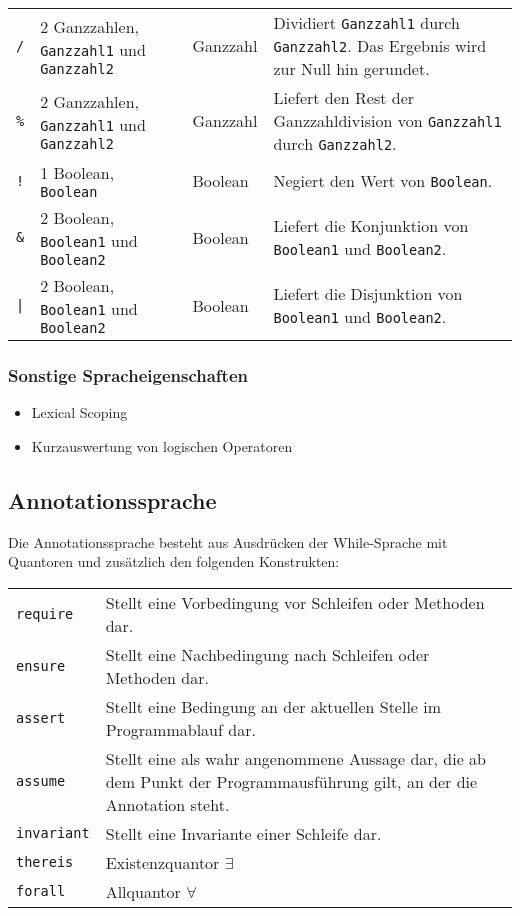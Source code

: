 \documentclass[a4paper,10pt]{article}
\begin{document}
\begin{tabularx}{\textwidth}{| l | X | l | X |}
\texttt{/} & 2 Ganzzahlen, \texttt{Ganzzahl1} und \texttt{Ganzzahl2} & Ganzzahl & Dividiert \texttt{Ganzzahl1} durch \texttt{Ganzzahl2}. Das Ergebnis wird zur Null hin gerundet.\\
\texttt{\%} & 2 Ganzzahlen, \texttt{Ganzzahl1} und \texttt{Ganzzahl2} & Ganzzahl & Liefert den Rest der Ganzzahldivision von \texttt{Ganzzahl1} durch \texttt{Ganzzahl2}.\\
\hline
\texttt{!} & 1 Boolean, \texttt{Boolean} & Boolean & Negiert den Wert von \texttt{Boolean}.\\
\texttt{\&} & 2 Boolean, \texttt{Boolean1} und \texttt{Boolean2} & Boolean & Liefert die Konjunktion von \texttt{Boolean1} und \texttt{Boolean2}.\\
\texttt{|} & 2 Boolean, \texttt{Boolean1} und \texttt{Boolean2} & Boolean & Liefert die Disjunktion von \texttt{Boolean1} und \texttt{Boolean2}.\\
\hline
\end{tabularx}
\subsubsection{Sonstige Spracheigenschaften}
\begin{itemize}
  \item Lexical Scoping
  \item Kurzauswertung von logischen Operatoren
\end{itemize}


\subsection{Annotationssprache}
Die Annotationssprache besteht aus Ausdr\"{u}cken der While-Sprache mit Quantoren und zus\"{a}tzlich den folgenden Konstrukten:\\
\begin{tabularx}{\textwidth}{| l | X |}
\hline
\texttt{require} & Stellt eine Vorbedingung vor Schleifen oder Methoden dar.\\
\texttt{ensure} & Stellt eine Nachbedingung nach Schleifen oder Methoden dar.\\
\texttt{assert} & Stellt eine Bedingung an der aktuellen Stelle im Programmablauf dar.\\
\texttt{assume} & Stellt eine als wahr angenommene Aussage dar, die ab dem Punkt der Programmausführung gilt, an der die Annotation steht.\\
\texttt{invariant} & Stellt eine Invariante einer Schleife dar.\\
\hline
\texttt{thereis} & Existenzquantor $\exists$\\
\texttt{forall} & Allquantor $\forall$\\
\hline
\end{tabularx}
\end{document}
